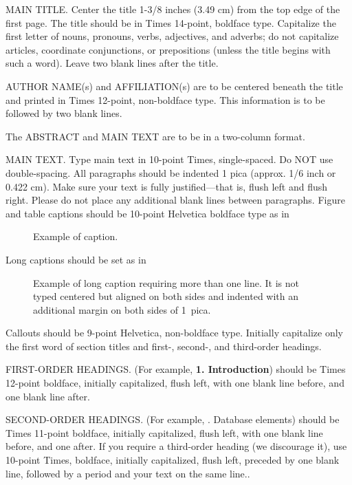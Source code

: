 \documentclass[times, 10pt,twocolumn]{article}
\begin{document}
MAIN TITLE. Center the title 1-3/8 inches (3.49 cm) from the top edge of 
the first page. The title should be in Times 14-point, boldface type. 
Capitalize the first letter of nouns, pronouns, verbs, adjectives, and 
adverbs; do not capitalize articles, coordinate conjunctions, or 
prepositions (unless the title begins with such a word). Leave two blank 
lines after the title.

AUTHOR NAME(s) and AFFILIATION(s) are to be centered beneath the title 
and printed in Times 12-point, non-boldface type. This information is to 
be followed by two blank lines.

The ABSTRACT and MAIN TEXT are to be in a two-column format. 

MAIN TEXT. Type main text in 10-point Times, single-spaced. Do NOT use 
double-spacing. All paragraphs should be indented 1 pica (approx. 1/6 
inch or 0.422 cm). Make sure your text is fully justified---that is, 
flush left and flush right. Please do not place any additional blank 
lines between paragraphs. Figure and table captions should be 10-point 
Helvetica boldface type as in
\begin{figure}[h]
   \caption{Example of caption.}
\end{figure}

\noindent Long captions should be set as in 
\begin{figure}[h] 
   \caption{Example of long caption requiring more than one line. It is 
     not typed centered but aligned on both sides and indented with an 
     additional margin on both sides of 1~pica.}
\end{figure}

\noindent Callouts should be 9-point Helvetica, non-boldface type. 
Initially capitalize only the first word of section titles and first-, 
second-, and third-order headings.

FIRST-ORDER HEADINGS. (For example, {\large \bf 1. Introduction}) 
should be Times 12-point boldface, initially capitalized, flush left, 
with one blank line before, and one blank line after.

SECOND-ORDER HEADINGS. (For example, {. Database elements}) 
should be Times 11-point boldface, initially capitalized, flush left, 
with one blank line before, and one after. If you require a third-order 
heading (we discourage it), use 10-point Times, boldface, initially 
capitalized, flush left, preceded by one blank line, followed by a period 
and your text on the same line..

\end{document}
